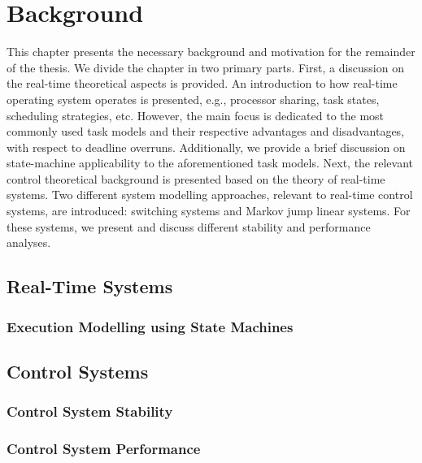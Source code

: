 \chapter{Background}%
\label{ch:background}%

This chapter presents the necessary background and motivation for the remainder of the thesis.
We divide the chapter in two primary parts.
First, a discussion on the real-time theoretical aspects is provided.
An introduction to how real-time operating system operates is presented, e.g., processor sharing, task states, scheduling strategies, etc.
However, the main focus is dedicated to the most commonly used task models and their respective advantages and disadvantages, with respect to deadline overruns.
Additionally, we provide a brief discussion on state-machine applicability to the aforementioned task models. 
Next, the relevant control theoretical background is presented based on the theory of real-time systems.
Two different system modelling approaches, relevant to real-time control systems, are introduced: switching systems and Markov jump linear systems.
For these systems, we present and discuss different stability and performance analyses.

\section{Real-Time Systems}%
\label{sec:background:rts}%
%

\subsection{Execution Modelling using State Machines}%
\label{sec:background:fsm}%
%


\section{Control Systems}%
\label{sec:background:ctrl}%
%

\subsection{Control System Stability}%
\label{sec:background:stability}%
%

\subsection{Control System Performance}%
\label{sec:background:performance}%
%


